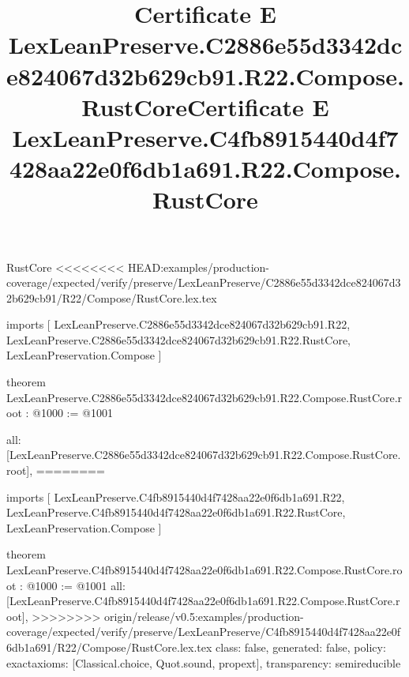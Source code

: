 \begin{lexlean}{RustCore}
<<<<<<<< HEAD:examples/production-coverage/expected/verify/preserve/LexLeanPreserve/C2886e55d3342dce824067d32b629cb91/R22/Compose/RustCore.lex.tex
\title{Certificate E LexLeanPreserve.C2886e55d3342dce824067d32b629cb91.R22.Compose.RustCore}
\begin{coremodule}
imports [
  LexLeanPreserve.C2886e55d3342dce824067d32b629cb91.R22,
  LexLeanPreserve.C2886e55d3342dce824067d32b629cb91.R22.RustCore,
  LexLeanPreservation.Compose
]

theorem LexLeanPreserve.C2886e55d3342dce824067d32b629cb91.R22.Compose.RustCore.root : @1000 := @1001 {
  all: [LexLeanPreserve.C2886e55d3342dce824067d32b629cb91.R22.Compose.RustCore.root],
========
\title{Certificate E LexLeanPreserve.C4fb8915440d4f7428aa22e0f6db1a691.R22.Compose.RustCore}
\begin{coremodule}
imports [
  LexLeanPreserve.C4fb8915440d4f7428aa22e0f6db1a691.R22,
  LexLeanPreserve.C4fb8915440d4f7428aa22e0f6db1a691.R22.RustCore,
  LexLeanPreservation.Compose
]

theorem LexLeanPreserve.C4fb8915440d4f7428aa22e0f6db1a691.R22.Compose.RustCore.root : @1000 := @1001 {
  all: [LexLeanPreserve.C4fb8915440d4f7428aa22e0f6db1a691.R22.Compose.RustCore.root],
>>>>>>>> origin/release/v0.5:examples/production-coverage/expected/verify/preserve/LexLeanPreserve/C4fb8915440d4f7428aa22e0f6db1a691/R22/Compose/RustCore.lex.tex
  class: false,
  generated: false,
  policy: exact{axioms: [Classical.choice, Quot.sound, propext]},
  transparency: semireducible
}


\end{coremodule}}
\end{coremodule}
\end{lexlean}
